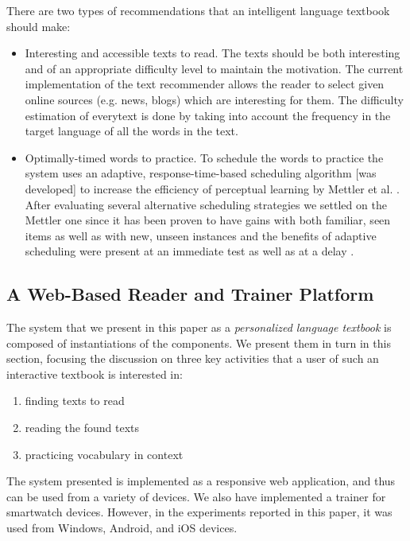 There are two types of recommendations that an intelligent language textbook should make: 
\begin{itemize}
	\item Interesting and accessible texts to read. The texts should be both interesting and of an appropriate difficulty level to maintain the motivation. The current implementation of the text recommender allows the reader to select given online sources (e.g. news, blogs) which are interesting for them. The difficulty estimation of everytext is done by taking into account the frequency in the target language of all the words in the text. 
	\item Optimally-timed words to practice. To schedule the words to practice the system uses an adaptive, response-time-based scheduling algorithm [was developed] to increase the efficiency of perceptual learning by Mettler et al. \cite{Mettler14-ARTS}. After evaluating several alternative scheduling strategies we settled on the Mettler one since it has been proven to have gains with both familiar, seen items as well as with new, unseen instances and the benefits of adaptive scheduling were present at an immediate test as well as at a delay \cite{Mettler14-ARTS}.
\end{itemize}



\subsection{A Web-Based Reader and Trainer Platform}



The system that we present in this paper as a {\em personalized language textbook} is composed of instantiations of the components. We present them in turn in this section, focusing the discussion on three key activities that a user of such an interactive textbook is interested in: 

\begin{enumerate}
	\item finding texts to read
	\item reading the found texts
	\item practicing vocabulary in context
\end{enumerate}

\begin{added}
	
	The system presented is implemented as a responsive web application, and thus can be used from a variety of devices. We also have implemented a trainer for smartwatch devices. However, in the experiments reported in this paper, it was used from Windows, Android, and iOS devices. 

\end{added}




